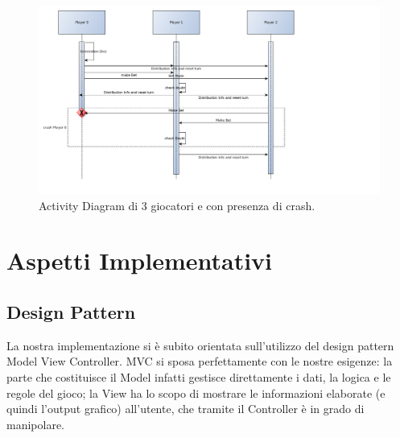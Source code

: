 \documentclass{llncs}
\begin{document}
		\begin{figure}[H]
			\includegraphics[scale=0.34]{img/Activity.png}
			\caption{\small{Activity Diagram di 3 giocatori e con presenza di crash.}}
			\label{activity}
		\end{figure}
	\newpage
	\section{Aspetti Implementativi}%
		\subsection{Design Pattern}
			La nostra implementazione si è subito orientata sull'utilizzo del design pattern Model View Controller\cite{MVC}. MVC si sposa perfettamente con le nostre esigenze: la parte che costituisce il Model infatti gestisce direttamente i dati, la logica e le regole del gioco; la View ha lo scopo di mostrare le informazioni elaborate (e quindi l'output grafico) all'utente, che tramite il Controller è in grado di manipolare.
			
\end{document}
